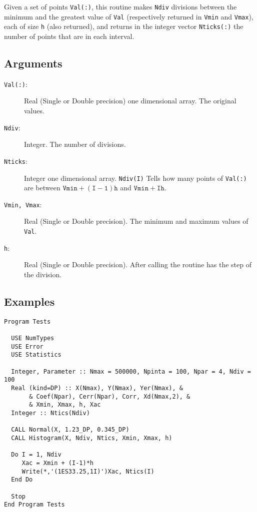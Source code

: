 Given a set of points \texttt{Val(:)}, this routine makes
\texttt{Ndiv} divisions between the minimum and the greatest value of
\texttt{Val} (respectively returned in \texttt{Vmin} and
\texttt{Vmax}), each of size \texttt{h} (also returned), and returns
in the integer vector \texttt{Nticks(:)} the number of points that are
in each interval. 

\subsection{Arguments}

\begin{description}
\item[\texttt{Val(:)}:] Real (Single or Double precision) one
  dimensional array. The original values.
\item[\texttt{Ndiv}: ] Integer. The number of divisions.
\item[\texttt{Nticks}:] Integer one dimensional array. \texttt{Ndiv(I)}
  Tells how many points of \texttt{Val(:)} are between
  $\mathtt{Vmin+(I-1)h}$ and $\mathtt{Vmin+Ih}$.
\item[\texttt{Vmin, Vmax}:] Real (Single or Double precision). The
  minimum and maximum values of \texttt{Val}.
\item[\texttt{h}:] Real (Single or Double precision). After calling
  the routine has the step of the division.
\end{description}

\subsection{Examples}

\begin{lstlisting}[emph=Histogram,
                   emphstyle=\color{blue},
                   frame=trBL,
                   caption=Making Histograms.,
                   label=histogram]
Program Tests

  USE NumTypes
  USE Error
  USE Statistics

  Integer, Parameter :: Nmax = 500000, Npinta = 100, Npar = 4, Ndiv = 100
  Real (kind=DP) :: X(Nmax), Y(Nmax), Yer(Nmax), &
       & Coef(Npar), Cerr(Npar), Corr, Xd(Nmax,2), &
       & Xmin, Xmax, h, Xac
  Integer :: Ntics(Ndiv)

  CALL Normal(X, 1.23_DP, 0.345_DP)
  CALL Histogram(X, Ndiv, Ntics, Xmin, Xmax, h)
  
  Do I = 1, Ndiv
     Xac = Xmin + (I-1)*h
     Write(*,'(1ES33.25,1I)')Xac, Ntics(I)
  End Do

  Stop
End Program Tests
\end{lstlisting}

